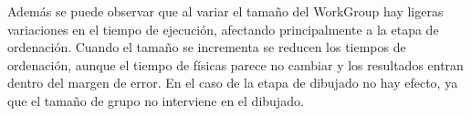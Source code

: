\documentclass[10pt,oneside,a4paper]{article}
\begin{document}
Además se puede observar que al variar el tamaño del WorkGroup hay ligeras variaciones en el tiempo de ejecución, afectando principalmente a la etapa de ordenación. Cuando el tamaño se incrementa se reducen los tiempos de ordenación, aunque el tiempo de físicas parece no cambiar y los resultados entran dentro del margen de error. En el caso de la etapa de dibujado no hay efecto, ya que el tamaño de grupo no interviene en el dibujado.
\end{document}
